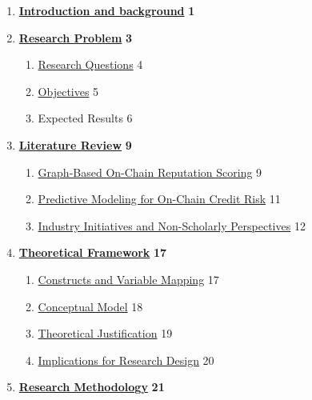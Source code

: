 \documentclass[
]{article}
\begin{document}
\begin{enumerate}
\def\labelenumi{\arabic{enumi}.}
\item
  \hyperref[gj4k9mjfpi2z]{\textbf{Introduction and background}} \textbf{1}
\item
  \hyperref[45gx6lhyoey9]{\textbf{Research Problem}} \textbf{3}

  \begin{enumerate}
  \def\labelenumii{\arabic{enumii}.}
  \item
    \hyperref[research-questions]{Research Questions} 4
  \item
    \hyperref[objectives]{Objectives} 5
  \item
    Expected Results 6
  \end{enumerate}
\item
  \hyperref[wm8uvozi6slm]{\textbf{Literature Review}} \textbf{9}

  \begin{enumerate}
  \def\labelenumii{\arabic{enumii}.}
  \item
    \hyperref[graph-based-on-chain-reputation-scoring]{Graph-Based On-Chain Reputation Scoring} 9
  \item
    \hyperref[predictive-modeling-for-on-chain-credit-risk]{Predictive Modeling for On-Chain Credit Risk} 11
  \item
    \hyperref[industry-initiatives-and-non-scholarly-perspectives]{Industry Initiatives and Non-Scholarly Perspectives} 12
  \end{enumerate}
\item
  \hyperref[_yt729zr91wh3]{\textbf{Theoretical Framework}} \textbf{17}

  \begin{enumerate}
  \def\labelenumii{\arabic{enumii}.}
  \item
    \hyperref[constructs-and-variable-mapping]{Constructs and Variable Mapping} 17
  \item
    \hyperref[section]{Conceptual Model} 18
  \item
    \hyperref[theoretical-justification]{Theoretical Justification} 19
  \item
    \hyperref[implications-for-research-design]{Implications for Research Design} 20
  \end{enumerate}
\item
  \hyperref[_kzff73xy9y90]{\textbf{Research Methodology}} \textbf{21}


\end{enumerate}
\end{document}
